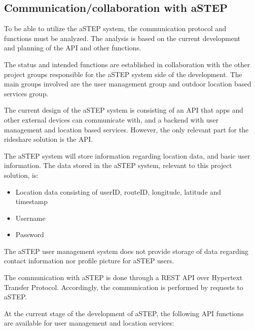 \subsection{Communication/collaboration with aSTEP}
To be able to utilize the aSTEP system, the communication protocol and functions must be analyzed. 
The analysis is based on the current development and planning of the API and other functions.

The status and intended functions are established in collaboration with the other project groups responsible for the aSTEP system side of the development. 
The main groups involved are the user management group and outdoor location based services group.

The current design of the aSTEP system is consisting of an API that apps and other external devices can communicate with, and a backend with user management and location based services.
However, the only relevant part for the rideshare solution is the API.

The aSTEP system will store information regarding location data, and basic user information. 
The data stored in the aSTEP system, relevant to this project solution, is:
\begin{itemize}
	\item Location data consisting of userID, routeID, longitude, latitude and timestamp
	\item Username
	\item Password
\end{itemize}

The aSTEP user management system does not provide storage of data regarding contact information nor profile picture for aSTEP users. 


The communication with aSTEP is done through a REST API over Hypertext Transfer Protocol.
Accordingly, the communication is performed by requests to aSTEP. 


At the current stage of the development of aSTEP, the following API functions are available for user management and location services:


